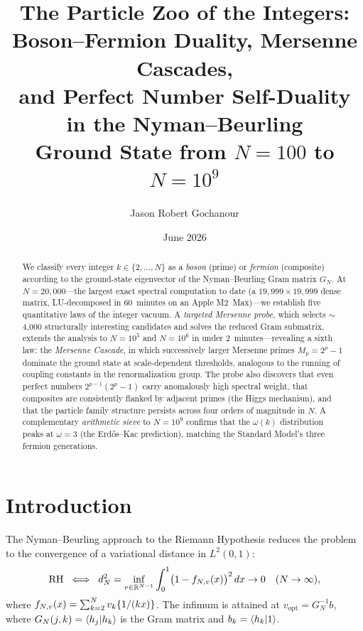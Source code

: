 \documentclass[11pt,a4paper]{article}
\title{%
  The Particle Zoo of the Integers:\\
  Boson--Fermion Duality, Mersenne Cascades,\\
  and Perfect Number Self-Duality in the Nyman--Beurling\\
  Ground State from $N = 100$ to $N = 10^9$%
}
\author{
  Jason Robert Gochanour
}
\date{June 2026}
\begin{document}
\maketitle

\begin{abstract}
We classify every integer $k \in \{2, \ldots, N\}$ as a \emph{boson} (prime)
or \emph{fermion} (composite) according to the ground-state eigenvector of
the Nyman--Beurling Gram matrix $G_N$. At $N = 20{,}000$---the largest
exact spectral computation to date (a $19{,}999 \times 19{,}999$ dense
matrix, LU-decomposed in 60~minutes on an Apple M2~Max)---we establish
five quantitative laws of the integer vacuum.
A \emph{targeted Mersenne probe}, which selects $\sim$4{,}000 structurally
interesting candidates and solves the reduced Gram submatrix, extends
the analysis to $N = 10^5$ and $N = 10^6$ in under 2~minutes---revealing
a sixth law: the \emph{Mersenne Cascade}, in which successively larger
Mersenne primes $M_p = 2^p - 1$ dominate the ground state at
scale-dependent thresholds, analogous to the running of coupling
constants in the renormalization group.
The probe also discovers that even perfect numbers
$2^{p-1}(2^p-1)$ carry anomalously high spectral weight, that
composites are consistently flanked by adjacent primes (the Higgs
mechanism), and that the particle family structure persists across
four orders of magnitude in $N$.
A complementary \emph{arithmetic sieve} to $N = 10^9$ confirms that the
$\omega(k)$ distribution peaks at $\omega = 3$ (the Erd\H{o}s--Kac
prediction), matching the Standard Model's three fermion generations.
\end{abstract}

\section{Introduction}

The Nyman--Beurling approach to the Riemann Hypothesis reduces the problem
to the convergence of a variational distance in $L^2(0,1)$:
\begin{equation}\label{eq:nb}
  \mathrm{RH} \;\iff\;
  d_N^2 = \inf_{v \in \mathbb{R}^{N-1}} \int_0^1 \bigl(1 - f_{N,v}(x)\bigr)^2\,dx
  \to 0 \quad (N \to \infty),
\end{equation}
where $f_{N,v}(x) = \sum_{k=2}^{N} v_k \{1/(kx)\}$.
The infimum is attained at $v_{\mathrm{opt}} = G_N^{-1} b$,
where $G_N(j,k) = \langle h_j | h_k \rangle$ is the Gram matrix and
$b_k = \langle h_k | 1 \rangle$.
\end{document}
